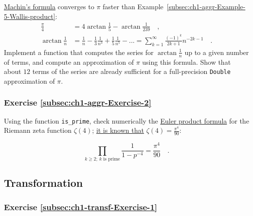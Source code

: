 \href{http://turner.faculty.swau.edu/mathematics/materialslibrary/pi/machin.html}{Machin's formula}
converges to $\pi$ faster than Example~\ref{subsec:ch1-aggr-Example-5-Wallis-product}:
\begin{align*}
\frac{\pi}{4} & =4\arctan\frac{1}{5}-\arctan\frac{1}{239}\quad,\\
\arctan\frac{1}{n} & =\frac{1}{n}-\frac{1}{3}\frac{1}{n^{3}}+\frac{1}{5}\frac{1}{n^{5}}-...=\sum_{k=1}^{\infty}\frac{\left(-1\right)^{k}}{2k+1}n^{-2k-1}\quad.
\end{align*}
Implement a function that computes the series for $\arctan\frac{1}{n}$
up to a given number of terms, and compute an approximation of $\pi$
using this formula. Show that about $12$ terms of the series are
already sufficient for a full-precision \lstinline!Double! approximation
of $\pi$.%
\begin{comment}
Code: def at(n: Double, l: Int) = (1 to l).map(k => 1.0{*}(k \% 2
{*} 2 - 1) / (2{*}k-1) / math.pow(n, 2{*}k-1) ).sum ; def p(l: Int)
= 16{*}at(5, l) - 4{*}at(239, l); p(12)
\end{comment}


\subsubsection{Exercise \label{subsec:ch1-aggr-Exercise-2}\ref{subsec:ch1-aggr-Exercise-2}}

Using the function \lstinline!is_prime!, check numerically the \href{https://en.wikipedia.org/wiki/Proof_of_the_Euler_product_formula_for_the_Riemann_zeta_function}{Euler product formula}
for the Riemann zeta function $\zeta(4)$; \href{https://ocw.mit.edu/courses/mathematics/18-104-seminar-in-analysis-applications-to-number-theory-fall-2006/projects/chan.pdf}{it is known that}
$\zeta(4)=\frac{\pi^{4}}{90}$:%
\begin{comment}
Code: def is\_prime(n: Int) = (2 to n-1).takeWhile(k => k{*}k <= n).forall(k
=> n \% k != 0); def ep(n: Int): Double = (2 to n).filter(is\_prime).map(k
=> 1.0 / (1.0 - 1.0 / k/k/k/k)).product; ep(100); pi{*}pi{*}pi{*}pi/90;
\end{comment}
\[
\prod_{k\geq2;~k\text{ is prime}}\frac{1}{1-p^{-4}}=\frac{\pi^{4}}{90}\quad.
\]
{} 

\subsection{Transformation}

\subsubsection{Exercise \label{subsec:ch1-transf-Exercise-1}\ref{subsec:ch1-transf-Exercise-1}}

